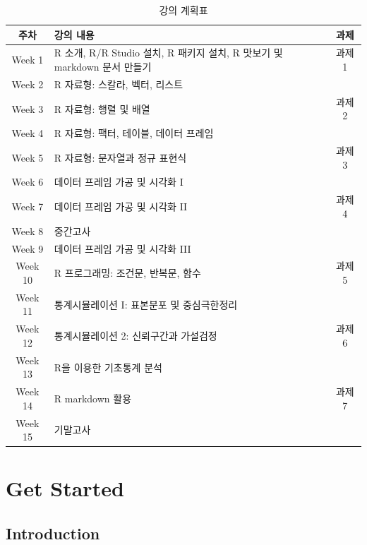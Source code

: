 \documentclass[
  11pt,
]{krantz}
\begin{document}
\begin{table}[H]

\caption{\label{tab:make-schedule-tab}강의 계획표}
\centering
\fontsize{10}{12}\selectfont
\begin{tabular}[t]{c>{\raggedright\arraybackslash}p{6cm}c}
\toprule
주차 & 강의 내용 & 과제\\
\midrule
\rowcolor{gray!6}  Week 1 & R 소개, R/R Studio 설치, R 패키지 설치, R 맛보기 및 markdown 문서 만들기 & 과제 1\\
Week 2 & R 자료형: 스칼라, 벡터, 리스트 & \\
\rowcolor{gray!6}  Week 3 & R 자료형: 행렬 및 배열 & 과제 2\\
Week 4 & R 자료형: 팩터, 테이블, 데이터 프레임 & \\
\rowcolor{gray!6}  Week 5 & R 자료형: 문자열과 정규 표현식 & 과제 3\\
\addlinespace
Week 6 & 데이터 프레임 가공 및 시각화 I & \\
\rowcolor{gray!6}  Week 7 & 데이터 프레임 가공 및 시각화 II & 과제 4\\
Week 8 & 중간고사 & \\
\rowcolor{gray!6}  Week 9 & 데이터 프레임 가공 및 시각화 III & \\
Week 10 & R 프로그래밍: 조건문, 반복문, 함수 & 과제 5\\
\addlinespace
\rowcolor{gray!6}  Week 11 & 통계시뮬레이션 I: 표본분포 및 중심극한정리 & \\
Week 12 & 통계시뮬레이션 2: 신뢰구간과 가설검정 & 과제 6\\
\rowcolor{gray!6}  Week 13 & R을 이용한 기초통계 분석 & \\
Week 14 & R markdown 활용 & 과제 7\\
\rowcolor{gray!6}  Week 15 & 기말고사 & \\
\bottomrule
\end{tabular}
\end{table}

\mainmatter

\hypertarget{part-get-started}{%
\part{Get Started}\label{part-get-started}}

\hypertarget{intro-chap}{%
\chapter{Introduction}\label{intro-chap}}
\end{document}
